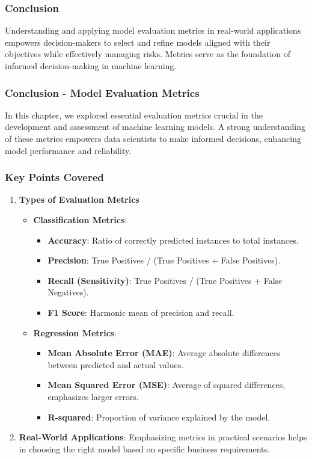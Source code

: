 \documentclass[aspectratio=169]{beamer}
\begin{document}
\begin{frame}[fragile]
    \frametitle{Conclusion}
    Understanding and applying model evaluation metrics in real-world applications empowers decision-makers to select and refine models aligned with their objectives while effectively managing risks. Metrics serve as the foundation of informed decision-making in machine learning.
\end{frame}

\begin{frame}[fragile]
    \frametitle{Conclusion - Model Evaluation Metrics}
    In this chapter, we explored essential evaluation metrics crucial in the development and assessment of machine learning models. 
    A strong understanding of these metrics empowers data scientists to make informed decisions, enhancing model performance and reliability.
\end{frame}

\begin{frame}[fragile]
    \frametitle{Key Points Covered}
    \begin{enumerate}
        \item \textbf{Types of Evaluation Metrics}
        \begin{itemize}
            \item \textbf{Classification Metrics}:
            \begin{itemize}
                \item \textbf{Accuracy}: Ratio of correctly predicted instances to total instances.
                \item \textbf{Precision}: True Positives / (True Positives + False Positives).
                \item \textbf{Recall (Sensitivity)}: True Positives / (True Positives + False Negatives).
                \item \textbf{F1 Score}: Harmonic mean of precision and recall.
            \end{itemize}
            \item \textbf{Regression Metrics}:
            \begin{itemize}
                \item \textbf{Mean Absolute Error (MAE)}: Average absolute differences between predicted and actual values.
                \item \textbf{Mean Squared Error (MSE)}: Average of squared differences, emphasizes larger errors.
                \item \textbf{R-squared}: Proportion of variance explained by the model.
            \end{itemize}
        \end{itemize}

        \item \textbf{Real-World Applications}:
        Emphasizing metrics in practical scenarios helps in choosing the right model based on specific business requirements.
    \end{enumerate}
\end{frame}
\end{document}
